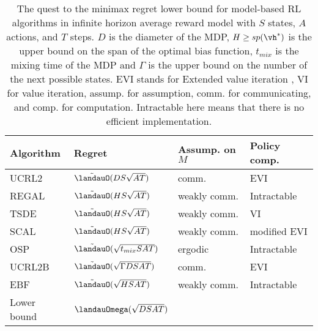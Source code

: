 \begin{table}[ht]
\begin{tabular}{|l|l|l|l|}
\hline
Algorithm & Regret & Assump. on $M$ & Policy comp.            \\ \hline
UCRL2 \cite{jaksch2010near}       & $\tilde{\landauO}(DS\sqrt{AT})$ & comm.         & EVI \\ 
REGAL \cite{bartlett2012regal}      & $\tilde{\landauO}(HS\sqrt{AT})$  & weakly comm. & Intractable   \\ 
TSDE \cite{ouyang2017learning}        & $\tilde{\landauO}(HS\sqrt{AT})$ & weakly comm. & VI       \\ 
SCAL \cite{fruit2018efficient}        & $\tilde{\landauO}(HS\sqrt{AT})$ & weakly comm. & modified EVI           \\
OSP \cite{ortner2020regret}         & $\tilde{\landauO}(\sqrt{t_{mix}SAT})$ & ergodic           & Intractable   \\ 
UCRL2B \cite{fruit2020improved}      & $\tilde{\landauO}(\sqrt{\Gamma DSAT})$ & comm.      & EVI                           \\
EBF \cite{zhang2019regret}         & $\tilde{\landauO}(\sqrt{HSAT})$ & weakly comm.     & Intractable   \\ \hline
Lower bound & $\landauOmega(\sqrt{DSAT})$ \cite{jaksch2010near} &                              &                               \\ \hline
\end{tabular}
\caption{The quest to the minimax regret lower bound for model-based RL algorithms in infinite horizon average reward model with $S$ states, $A$ actions, and $T$ steps.
$D$ is the diameter of the MDP, $H\ge sp(\vh^*)$ is the upper bound on the span of the optimal bias function, $t_{mix}$ is the mixing time of the MDP and $\Gamma$ is the upper bound on the number of the next possible states.
EVI stands for Extended value iteration \cite{jaksch2010near}, VI for value iteration, assump. for assumption, comm. for communicating, and comp. for computation.
Intractable here means that there is no efficient implementation.
}
\label{ch:rl:tab:infinite}
\end{table}


